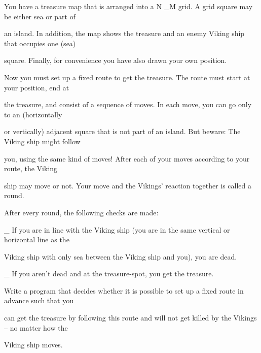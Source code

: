 You have a treasure map that is arranged into a N \_M grid. A grid square may be either sea or part of

an island. In addition, the map shows the treasure and an enemy Viking ship that occupies one (sea)

square. Finally, for convenience you have also drawn your own position.

Now you must set up a fixed route to get the treasure. The route must start at your position, end at

the treasure, and consist of a sequence of moves. In each move, you can go only to an (horizontally

or vertically) adjacent square that is not part of an island. But beware: The Viking ship might follow

you, using the same kind of moves! After each of your moves according to your route, the Viking

ship may move or not. Your move and the Vikings’ reaction together is called a round.

After every round, the following checks are made:

\_ If you are in line with the Viking ship (you are in the same vertical or horizontal line as the

Viking ship with only sea between the Viking ship and you), you are dead.

\_ If you aren’t dead and at the treasure-spot, you get the treasure.

Write a program that decides whether it is possible to set up a fixed route in advance such that you

can get the treasure by following this route and will not get killed by the Vikings – no matter how the

Viking ship moves.